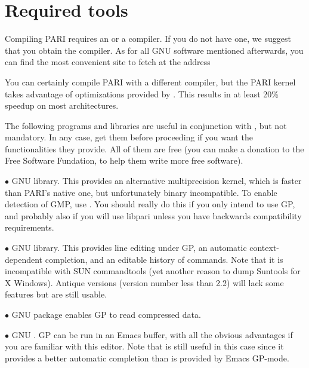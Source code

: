 %
%

\def\tocwrite#1{}
\section{Required tools}

Compiling PARI requires an  or a  compiler. If you do
not have one, we suggest that you obtain the  compiler. As for
all GNU software mentioned afterwards, you can find the most convenient site
to fetch  at the address


\noindent You can certainly compile PARI with a different compiler, but the
PARI kernel takes advantage of optimizations provided by . This
results in at least 20\% speedup on most architectures.

 The following programs and libraries are useful
in conjunction with , but not mandatory. In any case, get them before
proceeding if you want the functionalities they provide. All of them are free
(you can make a donation to the Free Software Fundation, to help them write
more free software).

  $\bullet$ GNU  library. This provides an alternative multiprecision
kernel, which is faster than PARI's native one, but unfortunately binary
incompatible. To enable detection of GMP, use .
You should really do this if you only intend to use GP, and probably also if
you will use libpari unless you have backwards compatibility requirements.

  $\bullet$ GNU  library. This provides line editing under GP,
an automatic context-dependent completion, and an editable history of
commands. Note that it is incompatible with SUN commandtools (yet another
reason to dump Suntools for X Windows). Antique versions (version number less
than 2.2) will lack some features but are still usable.

  $\bullet$ GNU  package enables GP to read compressed
data.

  $\bullet$ GNU . GP can be run in an Emacs buffer, with all the
obvious advantages if you are familiar with this editor. Note that
 is still useful in this case since it provides a better
automatic completion than is provided by Emacs GP-mode.

